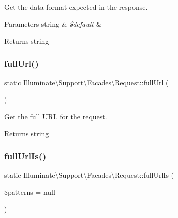 Get the data format expected in the response.


\begin{DoxyParams}[1]{Parameters}
string & {\em \$default} & \\
\hline
\end{DoxyParams}
\begin{DoxyReturn}{Returns}
string 
\end{DoxyReturn}
\mbox{\label{class_illuminate_1_1_support_1_1_facades_1_1_request_a45110aa4e3e4f712691453fd39a241e0}} 
\subsubsection{\texorpdfstring{full\+Url()}{fullUrl()}}
{\footnotesize\ttfamily static Illuminate\textbackslash{}\+Support\textbackslash{}\+Facades\textbackslash{}\+Request\+::full\+Url (\begin{DoxyParamCaption}{ }\end{DoxyParamCaption})\hspace{0.3cm}{\ttfamily [static]}}

Get the full \mbox{\hyperlink{class_illuminate_1_1_support_1_1_facades_1_1_u_r_l}{U\+RL}} for the request.

\begin{DoxyReturn}{Returns}
string 
\end{DoxyReturn}
\mbox{\label{class_illuminate_1_1_support_1_1_facades_1_1_request_aa19fd01c7be2110f177b8cff6559efb2}} 
\subsubsection{\texorpdfstring{full\+Url\+Is()}{fullUrlIs()}}
{\footnotesize\ttfamily static Illuminate\textbackslash{}\+Support\textbackslash{}\+Facades\textbackslash{}\+Request\+::full\+Url\+Is (\begin{DoxyParamCaption}\item[{}]{\$patterns = {\ttfamily null} }\end{DoxyParamCaption})\hspace{0.3cm}{\ttfamily [static]}}

